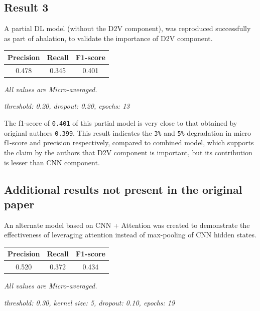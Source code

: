 \documentclass[11pt,a4paper]{article}
\begin{document}
\subsection{Result 3}

A partial DL model (without the D2V component), was reproduced successfully as part of abalation, to validate the importance of D2V component.
\newline

\begin{small}
\begin{tabular}{ ccc }
  \hline
  	Precision & Recall & F1-score \\
  \hline
  	0.478 & 0.345 & 0.401 \\
  \hline
\end{tabular}

\textit{All values are Micro-averaged.}

\textit{threshold: 0.20, dropout: 0.20, epochs: 13}
\end{small}
\newline


The f1-score of \texttt{0.401} of this partial model is very close to that obtained by original authors \texttt{0.399}. This result indicates the \texttt{3\%} and \texttt{5\%} degradation in micro f1-score and precision respectively, compared to combined model, which supports the claim by the authors that D2V component is important, but its contribution is lesser than CNN component.

\subsection{Additional results not present in the original paper}

An alternate model based on CNN + Attention was created to demonstrate the effectiveness of leveraging attention instead of max-pooling of CNN hidden states.
\newline

\begin{small}
\begin{tabular}{ ccc }
  \hline
  	Precision & Recall & F1-score \\
  \hline
  	0.520 & 0.372 & 0.434 \\
  \hline
\end{tabular}

\textit{All values are Micro-averaged.}

\textit{threshold: 0.30, kernel size: 5, dropout: 0.10, epochs: 19}
\end{small}
\newline
\end{document}
